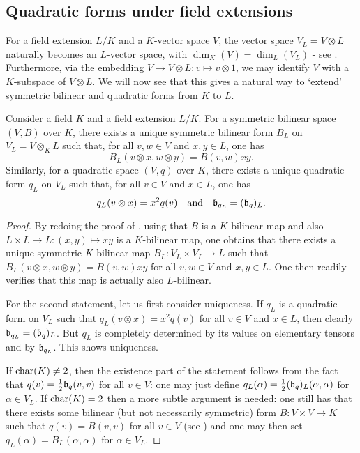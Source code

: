 \documentclass[12pt, leqno, british]{amsart}
\begin{document}
\subsection{Quadratic forms under field extensions}
For a field extension $L/K$ and a $K$-vector space $V$, the vector space $V_L = V \otimes L$ naturally becomes an $L$-vector space, with $\dim_K(V) = \dim_L(V_L)$ - see .
Furthermore, via the embedding $V \to V \otimes L : v \mapsto v \otimes 1$, we may identify $V$ with a $K$-subspace of $V \otimes L$.
We will now see that this gives a natural way to `extend' symmetric bilinear and quadratic forms from $K$ to $L$.
\begin{prop}\label{P:scalar-extension}
Consider a field $K$ and a field extension $L/K$.
For a symmetric bilinear space $(V, B)$ over $K$, there exists a unique symmetric bilinear form $B_L$ on $V_L = V \otimes_K L$ such that, for all $v, w \in V$ and $x, y \in L$, one has
$$ B_L(v \otimes x, w \otimes y) = B(v, w)xy.$$
Similarly, for a quadratic space $(V, q)$ over $K$, there exists a unique quadratic form $q_L$ on $V_L$ such that, for all $v \in V$ and $x \in L$, one has
$$q_L(v \otimes x) = x^2q(v) \quad \text{and} \quad \mathfrak{b}_{q_L} = (\mathfrak{b}_q)_L.$$
\end{prop}
\begin{proof}
By redoing the proof of , using that $B$ is a $K$-bilinear map and also $L \times L \to L : (x, y) \mapsto xy$ is a $K$-bilinear map, one obtains that there exists a unique symmetric $K$-bilinear map $B_L : V_L \times V_L \to L$ such that $B_L(v \otimes x, w \otimes y) = B(v, w)xy$ for all $v, w \in V$ and $x, y \in L$.
One then readily verifies that this map is actually also $L$-bilinear.

For the second statement, let us first consider uniqueness.
If $q_L$ is a quadratic form on $V_L$ such that $q_L(v \otimes x) = x^2 q(v)$ for all $v \in V$ and $x \in L$, then clearly $\mathfrak{b}_{q_L} = (\mathfrak{b}_q)_L$.
But $q_L$ is completely determined by its values on elementary tensors and by $\mathfrak{b}_{q_L}$.
This shows uniqueness.

If $\operatorname{char}(K) \neq 2$, then the existence part of the statement follows from the fact that $q(v) = \frac{1}{2}\mathfrak{b}_q(v, v)$ for all $v \in V$: one may just define $q_L(\alpha) = \frac{1}{2}(\mathfrak{b}_q)_L(\alpha, \alpha)$ for $\alpha \in V_L$.
If $\operatorname{char}(K) = 2$ then a more subtle argument is needed: one still has that there exists some bilinear (but not necessarily symmetric) form $B : V \times V \to K$ such that $q(v) = B(v, v)$ for all $v \in V$ (see \autocite[Section 7]{ElmanKarpenkoMerkurjev}) and one may then set $q_L(\alpha) = B_L(\alpha, \alpha)$ for $\alpha \in V_L$.
\end{proof}
\end{document}

